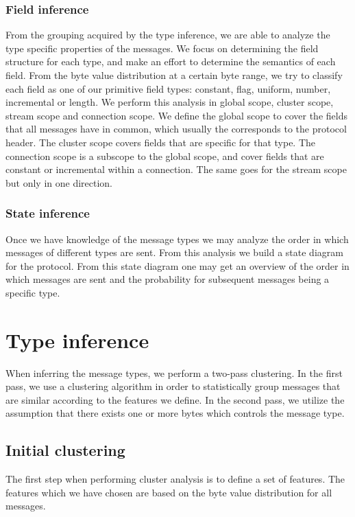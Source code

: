 \documentclass[a4paper]{report}
\begin{document}
\subsubsection{Field inference}
From the grouping acquired by the type inference, we are able to analyze the
type specific properties of the messages. We focus on determining the field
structure for each type, and make an effort to determine the semantics of each
field. From the byte value distribution at a certain byte range, we try to
classify each field as one of our primitive field types: constant, flag,
uniform, number, incremental or length. We perform this analysis in global
scope, cluster scope, stream scope and connection scope. We define the
global scope to cover the fields that all messages have in common, which
usually the corresponds to the protocol header. The cluster scope covers fields
that are specific for that type. The connection scope is a subscope to the
global scope, and cover fields that are constant or incremental within a
connection. The same goes for the stream scope but only in one direction.

\subsubsection{State inference}
Once we have knowledge of the message types we may analyze the order in which
messages of different types are sent. From this analysis we build a state
diagram for the protocol. From this state diagram one may get an overview of
the order in which messages are sent and the probability for subsequent
messages being a specific type.

\section{Type inference}
\label{sec:type_inf}
When inferring the message types, we perform a two-pass clustering. In the
first pass, we use a clustering algorithm in order to statistically group
messages that are similar according to the features we define. In the second
pass, we utilize the assumption that there exists one or more bytes which
controls the message type.

\subsection{Initial clustering}
\label{sec:init_clust}
The first step when performing cluster analysis is to define a set of features.
The features which we have chosen are based on the byte value distribution for
all messages.
\end{document}
